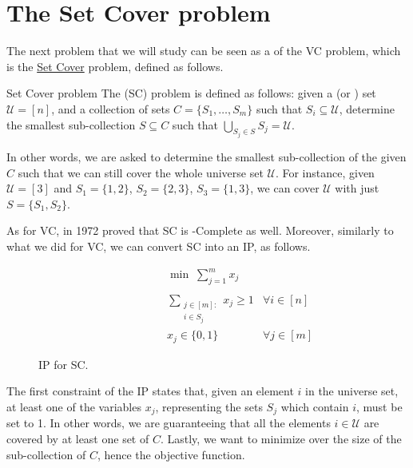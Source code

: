 \documentclass[a4paper, 12pt]{report}
\begin{document}
    \section{The Set Cover problem}

    The next problem that we will study can be seen as a  of the VC problem, which is the \href{https://en.wikipedia.org/wiki/Set_cover_problem}{Set Cover} problem, defined as follows.

    \begin{frameddefn}{Set Cover problem}
        The  (SC) problem is defined as follows: given a  (or ) set $\mathcal U = [n]$, and a collection of sets $C = \{S_1, \ldots, S_m\}$ such that $S_i \subseteq \mathcal U$, determine the smallest sub-collection $S \subseteq C$ such that $\bigcup_{S_j \in S}{S_j} = \mathcal U$.
    \end{frameddefn}

    In other words, we are asked to determine the smallest sub-collection of the given $C$ such that we can still cover the whole universe set $\mathcal U$. For instance, given $\mathcal U = [3]$ and $S_1 = \{1, 2\}$, $S_2 = \{2, 3\}$, $S_3 = \{1, 3\}$, we can cover $\mathcal U$ with just $S = \{S_1, S_2\}$.

    As for VC, in 1972 \cite{karp} proved that SC is \NPclass-Complete as well. Moreover, similarly to what we did for VC, we can convert SC into an IP, as follows.

    \begin{figure}[H]
        \centering
        \[\begin{array}{ccl}
            \qquad\qquad\quad
            & \min \; \displaystyle \sum_{j = 1}^m {x_j} \\\\
            & \sum\limits_{\substack{j \in [m] : \\ i \in S_j}}{x_j} \ge 1 & \forall i \in [n] \\
            & x_j \in \{0, 1\} & \forall j \in [m]
        \end{array}\]
        \caption{IP for SC.}
    \end{figure}

    The first constraint of the IP states that, given an element $i$ in the universe set, at least one of the variables $x_j$, representing the sets $S_j$ which contain $i$, must be set to 1. In other words, we are guaranteeing that all the elements $i \in \mathcal U$ are covered by at least one set of $C$. Lastly, we want to minimize over the size of the sub-collection of $C$, hence the objective function.
\end{document}
